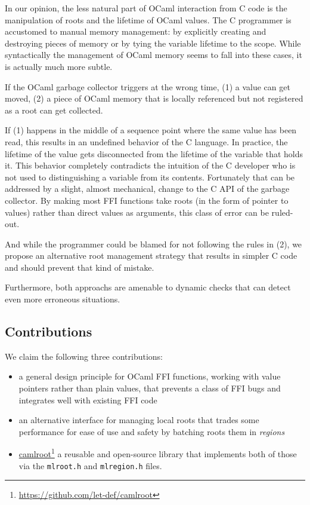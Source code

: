 \documentclass[a4paper]{easychair}
\newcommand{\cpp}[1]{\lstinline[style=C++]{#1}}
\newcommand\fnurl[2]{%
\href{#2}{#1}\footnote{\url{#2}}%
}
\begin{document}
In our opinion, the less natural part of OCaml interaction from C code
is the manipulation of roots and the lifetime of OCaml values. The C
programmer is accustomed to manual memory management: by explicitly
creating and destroying pieces of memory or by tying the variable
lifetime to the scope. While syntactically the management of OCaml
memory seems to fall into these cases, it is actually much more subtle.

If the OCaml garbage collector triggers at the wrong time, (1) a value
can get moved, (2) a piece of OCaml memory that is locally referenced
but not registered as a root can get collected.

If (1) happens in the middle of a sequence point %
where the same value has been read, this results in an undefined behavior of
the C language. In practice, the lifetime of the value gets disconnected from
the lifetime of the variable that holds it.  This behavior completely
contradicts the intuition of the C developer who is not used to distinguishing
a variable from its contents.  Fortunately that can be addressed by a slight,
almost mechanical, change to the C API of the garbage collector. By making most
FFI functions take roots (in the form of pointer to values) rather than direct
values as arguments, this class of error can be ruled-out.

And while the programmer could be blamed for not following the rules in
(2), we propose an alternative root management strategy that results in simpler
C code and should prevent that kind of mistake.

Furthermore, both approachs are amenable to dynamic checks that can detect even
more erroneous situations.

\subsection{Contributions}

We claim the following three contributions:
%
\begin{itemize}
\item a general design principle for OCaml FFI functions, working with value
      pointers rather than plain values, that prevents a class of FFI bugs and
      integrates well with existing FFI code
\item an alternative interface for managing local roots that trades some
      performance for ease of use and safety by batching roots them in
      {\em regions}
\item \fnurl{camlroot}{https://github.com/let-def/camlroot} a reusable and
      open-source library that implements both of those via the \cpp{mlroot.h}
      and \cpp{mlregion.h} files.
\end{itemize}
\end{document}
